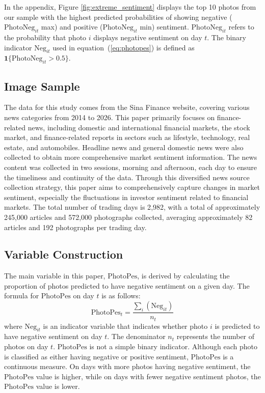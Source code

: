 \documentclass[AER]{AEA}
\begin{document}
In the appendix, Figure \ref{fig:extreme_sentiment} displays the top 10 photos from our sample with the highest predicted probabilities of showing negative ($\text{PhotoNeg}_{it}$ max) and positive ($\text{PhotoNeg}_{it}$ min) sentiment. $\text{PhotoNeg}_{it}$ refers to the probability that photo $i$ displays negative sentiment on day $t$. The binary indicator $\text{Neg}_{it}$ used in equation~(\ref{eq:photopes}) is defined as $\mathbf{1}\{\text{PhotoNeg}_{it} > 0.5\}$.

\subsection{Image Sample}
The data for this study comes from the Sina Finance website, covering various news categories from 2014 to 2026. This paper primarily focuses on finance-related news, including domestic and international financial markets, the stock market, and finance-related reports in sectors such as lifestyle, technology, real estate, and automobiles. Headline news and general domestic news were also collected to obtain more comprehensive market sentiment information. The news content was collected in two sessions, morning and afternoon, each day to ensure the timeliness and continuity of the data. Through this diversified news source collection strategy, this paper aims to comprehensively capture changes in market sentiment, especially the fluctuations in investor sentiment related to financial markets. The total number of trading days is 2{,}982, with a total of approximately 245{,}000 articles and 572{,}000 photographs collected, averaging approximately 82 articles and 192 photographs per trading day.

\subsection{Variable Construction}
The main variable in this paper, $\text{PhotoPes}$, is derived by calculating the proportion of photos predicted to have negative sentiment on a given day. The formula for $\text{PhotoPes}$ on day $t$ is as follows:
\begin{equation}
\text{PhotoPes}_t = \frac{\sum_i (\text{Neg}_{it})}{n_t}
\label{eq:photopes}
\end{equation}
where $\text{Neg}_{it}$ is an indicator variable that indicates whether photo $i$ is predicted to have negative sentiment on day $t$. The denominator $n_t$ represents the number of photos on day $t$. $\text{PhotoPes}$ is not a simple binary indicator. Although each photo is classified as either having negative or positive sentiment, $\text{PhotoPes}$ is a continuous measure. On days with more photos having negative sentiment, the $\text{PhotoPes}$ value is higher, while on days with fewer negative sentiment photos, the $\text{PhotoPes}$ value is lower.
\end{document}
